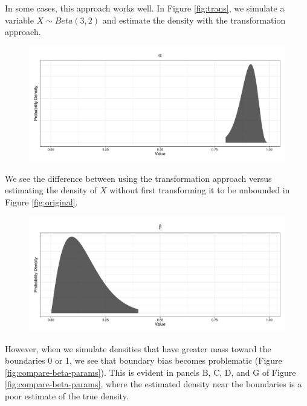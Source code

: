 \documentclass[12pt,twoside]{smiththesis}
\begin{document}
In some cases, this approach works well. In Figure \ref{fig:trans}, we simulate a variable \(X \sim Beta(3,2)\) and estimate the density with the transformation approach.
\begin{figure}

{\centering \includegraphics{thesis_files/figure-latex/unnamed-chunk-35-1} 

}

\caption{\label{fig:trans}}\label{fig:unnamed-chunk-35}
\end{figure}
We see the difference between using the transformation approach versus estimating the density of \(X\) without first transforming it to be unbounded in Figure \ref{fig:original}.
\begin{figure}

{\centering \includegraphics{thesis_files/figure-latex/unnamed-chunk-36-1} 

}

\caption{\label{fig:original}}\label{fig:unnamed-chunk-36}
\end{figure}
However, when we simulate densities that have greater mass toward the boundaries 0 or 1, we see that boundary bias becomes problematic (Figure \ref{fig:compare-beta-params}). This is evident in panels B, C, D, and G of Figure \ref{fig:compare-beta-params}, where the estimated density near the boundaries is a poor estimate of the true density.
\end{document}
